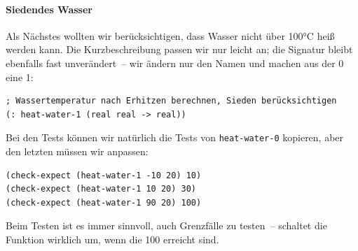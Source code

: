 \paragraph{Siedendes Wasser} Als Nächstes wollten wir berücksichtigen,
dass Wasser nicht über 100\si{\degree}C heiß werden kann.  Die Kurzbeschreibung
passen wir nur leicht an; die Signatur bleibt ebenfalls fast
unverändert~-- wir ändern nur den Namen und machen aus der 0 eine 1:
%
\begin{lstlisting}
; Wassertemperatur nach Erhitzen berechnen, Sieden berücksichtigen
(: heat-water-1 (real real -> real))
\end{lstlisting}
%
Bei den Tests können wir natürlich die Tests von \lstinline{heat-water-0}
kopieren, aber den letzten müssen wir anpassen:
%
\begin{lstlisting}
(check-expect (heat-water-1 -10 20) 10)
(check-expect (heat-water-1 10 20) 30)
(check-expect (heat-water-1 90 20) 100)
\end{lstlisting}
%
Beim Testen ist es immer sinnvoll, auch Grenzfälle zu testen~--
schaltet die Funktion wirklich um, wenn die 100 erreicht sind. %
                              
